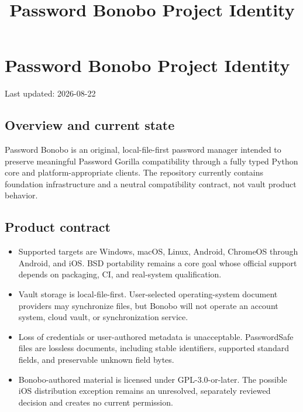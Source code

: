 \documentclass[
  letterpaper,
]{article}
\title{Password Bonobo Project Identity}
\author{}
\date{}
\providecommand{\tightlist}{%
  \setlength{\itemsep}{0pt}\setlength{\parskip}{0pt}}
\begin{document}
\maketitle

{
\setcounter{tocdepth}{3}
\tableofcontents
}
\section{Password Bonobo Project Identity}\label{password-bonobo-project-identity}

Last updated: 2026-08-22

\subsection{Overview and current state}\label{overview-and-current-state}

Password Bonobo is an original, local-file-first password manager intended to preserve meaningful Password Gorilla
compatibility through a fully typed Python core and platform-appropriate clients. The repository currently contains
foundation infrastructure and a neutral compatibility contract, not vault product behavior.

\subsection{Product contract}\label{product-contract}

\begin{itemize}
\tightlist
\item
  Supported targets are Windows, macOS, Linux, Android, ChromeOS through Android, and iOS. BSD portability remains a
  core goal whose official support depends on packaging, CI, and real-system qualification.
\item
  Vault storage is local-file-first. User-selected operating-system document providers may synchronize files, but Bonobo
  will not operate an account system, cloud vault, or synchronization service.
\item
  Loss of credentials or user-authored metadata is unacceptable. PasswordSafe files are lossless documents, including
  stable identifiers, supported standard fields, and preservable unknown field bytes.
\item
  Bonobo-authored material is licensed under GPL-3.0-or-later. The possible iOS distribution exception remains an
  unresolved, separately reviewed decision and creates no current permission.
\end{itemize}
\end{document}
